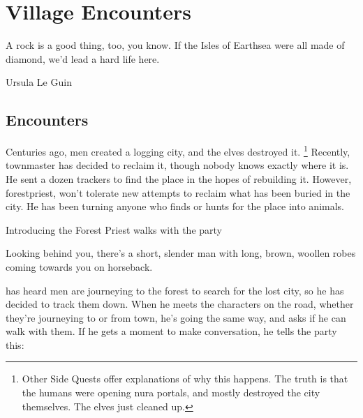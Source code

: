 \chapter{Village Encounters}

\epigraph{A rock is a good thing, too, you know. If the Isles of Earthsea were all made of diamond, we'd lead a hard life here.}{Ursula Le Guin}

\renewcommand{\sqarea}{Villages}

\setcounter{encnum}{1}
\renewcommand{\encsymbol}{\ding{170}}

\section{Encounters}

\begin{multicols}{2}

\resumecontents[Town]
\resumecontents[Forest]

\label{herenofarther}

\stopcontents[Town]
\stopcontents[Forest]

\startcontents[sq]

\sqminitoc

\noindent
Centuries ago, men created a logging city, and the elves destroyed it.
\footnote{Other Side Quests offer explanations of why this happens.
The truth is that the humans were opening nura portals, and mostly destroyed the city themselves.
The elves just cleaned up.} 
Recently, \gls{townmaster} has decided to reclaim it, though nobody knows exactly where it is.
He sent a dozen trackers to find the place in the hopes of rebuilding it.
However, \gls{forestpriest}, won't tolerate new attempts to reclaim what has been buried in the city.
He has been turning anyone who finds or hunts for the place into animals.

{Introducing the Forest Priest}%
{ walks with the party}%

\begin{boxtext}

	Looking behind you, there's a short, slender man with long, brown, woollen robes coming towards you on horseback.

\end{boxtext}

 has heard men are journeying to the forest to search for the lost city, so he has decided to track them down.
When he meets the characters on the road, whether they're journeying to or from \gls{town}, he's going the same way, and asks if he can walk with them.
If he gets a moment to make conversation, he tells the party this:


\end{multicols}
